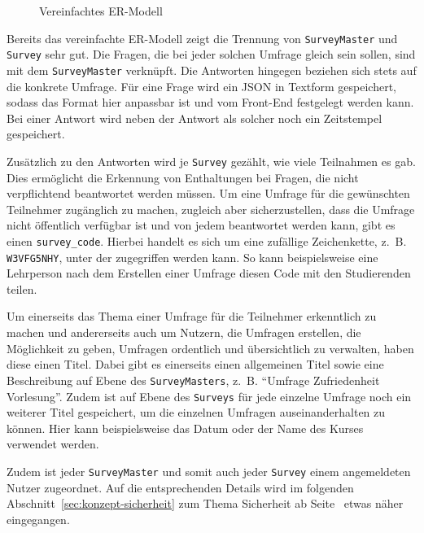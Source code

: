 \begin{figure}[ht]
	\centering
	\def\svgscale{0.72}
	\graphicspath{{img/backend/database/}}
	\scriptsize{}
	\caption{Vereinfachtes \acs{ER-Modell}}
	\label{fig:er-model-simplified}
\end{figure}

Bereits das vereinfachte \acs{ER-Modell} zeigt die Trennung von \texttt{SurveyMaster} und \texttt{Survey} sehr gut.
Die Fragen, die bei jeder solchen Umfrage gleich sein sollen, sind mit dem \texttt{SurveyMaster} verknüpft.
Die Antworten hingegen beziehen sich stets auf die konkrete Umfrage.
Für eine Frage wird ein \acs{JSON} in Textform gespeichert, sodass das Format hier anpassbar ist und vom Front-End festgelegt werden kann.
Bei einer Antwort wird neben der Antwort als solcher noch ein Zeitstempel gespeichert.

Zusätzlich zu den Antworten wird je \texttt{Survey} gezählt, wie viele Teilnahmen es gab.
Dies ermöglicht die Erkennung von Enthaltungen bei Fragen, die nicht verpflichtend beantwortet werden müssen.
Um eine Umfrage für die gewünschten Teilnehmer zugänglich zu machen, zugleich aber sicherzustellen, dass die Umfrage nicht öffentlich verfügbar ist und von jedem beantwortet werden kann, gibt es einen \texttt{survey\_code}.
Hierbei handelt es sich um eine zufällige Zeichenkette, z.~B. \texttt{W3VFG5NHY}, unter der zugegriffen werden kann.
So kann beispielsweise eine Lehrperson nach dem Erstellen einer Umfrage diesen Code mit den Studierenden teilen.

Um einerseits das Thema einer Umfrage für die Teilnehmer erkenntlich zu machen und andererseits auch um Nutzern, die Umfragen erstellen, die Möglichkeit zu geben, Umfragen ordentlich und übersichtlich zu verwalten, haben diese einen Titel.
Dabei gibt es einerseits einen allgemeinen Titel sowie eine Beschreibung auf Ebene des \texttt{SurveyMasters}, z.~B. \enquote{Umfrage Zufriedenheit Vorlesung}.
Zudem ist auf Ebene des \texttt{Surveys} für jede einzelne Umfrage noch ein weiterer Titel gespeichert, um die einzelnen Umfragen auseinanderhalten zu können.
Hier kann beispielsweise das Datum oder der Name des Kurses verwendet werden.

Zudem ist jeder \texttt{SurveyMaster} und somit auch jeder \texttt{Survey} einem angemeldeten Nutzer zugeordnet.
Auf die entsprechenden Details wird im folgenden Abschnitt~\ref{sec:konzept-sicherheit} zum Thema Sicherheit ab Seite~\pageref{sec:authentifizierung} etwas näher eingegangen.
